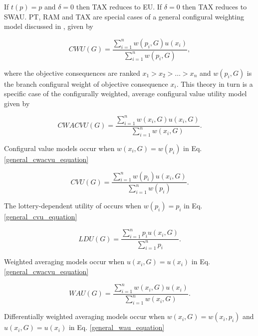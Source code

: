 \documentclass{article}\usepackage[]{graphicx}\usepackage[]{color}
\begin{document}
If $t(p) = p$ and $\delta = 0$ then TAX reduces to EU.
If $\delta = 0$ then TAX reduces to SWAU.
PT, RAM and TAX are special cases of a general configural weighting model discussed in \citet[][p. 91-92]{Birnbaum_2004}, given by

\begin{equation}
CWU(G) = \frac{\displaystyle \sum\limits_{i=1}^{n} w(p_i, G) u(x_i)}{\displaystyle \sum\limits_{i=1}^{n} w(p_i, G)},
\label{general_cwu_equation}
\end{equation}

where the objective consequences are ranked $x_1 > x_2 > \ldots > x_n$ and $w(p_i, G)$ is the branch configural weight of objective consequence $x_i$.
This theory in turn is a specific case of the configurally weighted, average configural value utility model \cite[p. 40]{Birnbaum_1999} given by

\begin{equation}
CWACVU(G) = \frac{\displaystyle \sum\limits_{i=1}^{n} w(x_i, G) u(x_i, G)}{\displaystyle \sum\limits_{i=1}^{n} w(x_i, G)}.
\label{general_cwacvu_equation}
\end{equation}

Configural value models occur when $w(x_i, G) = w(p_i)$ in Eq. \eqref{general_cwacvu_equation}

\begin{equation}
CVU(G) = \frac{\displaystyle \sum\limits_{i=1}^{n} w(p_i) u(x_i, G)}{\displaystyle \sum\limits_{i=1}^{n} w(p_i)}.
\label{general_cvu_equation}
\end{equation}

The lottery-dependent utility of \cite{Becker_Sarin_1987} occurs when $w(p_i) = p_i$ in Eq. \eqref{general_cvu_equation}

\begin{equation}
LDU(G) = \frac{\displaystyle \sum\limits_{i=1}^{n} p_i u(x_i, G)}{\displaystyle \sum\limits_{i=1}^{n} p_i}.
\label{ldu_equation}
\end{equation}

Weighted averaging models occur when $u(x_i, G) = u(x_i)$ in Eq. \eqref{general_cwacvu_equation}

\begin{equation}
WAU(G) = \frac{\displaystyle \sum\limits_{i=1}^{n} w(x_i, G) u(x_i)}{\displaystyle \sum\limits_{i=1}^{n} w(x_i, G)}.
\label{general_wau_equation}
\end{equation}

Differentially weighted averaging models occur when $w(x_i, G) = w(x_i, p_i)$ and $u(x_i, G) = u(x_i)$ in Eq. \eqref{general_wau_equation}
\end{document}
